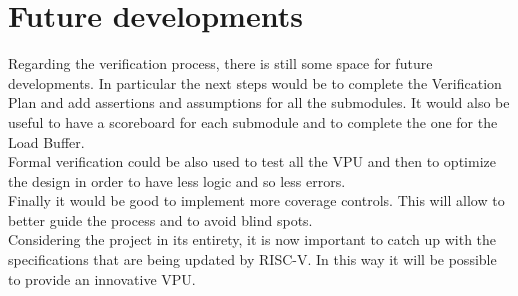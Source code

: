 \section{Future developments}
Regarding the verification process, there is still some space for future developments. In particular the next steps would be to complete the Verification Plan and add assertions and assumptions for all the submodules. 
It would also be useful to have a scoreboard for each submodule and to complete the one for the Load Buffer.\\
Formal verification could be also used to test all the VPU and then to optimize the design in order to have less logic and so less errors.\\
Finally it would be good to implement more coverage controls. This will allow to better guide the process and to avoid blind spots.\\

Considering the project in its entirety, it is now important to catch up with the specifications that are being updated by RISC-V. In this way it will be possible to provide an innovative VPU.